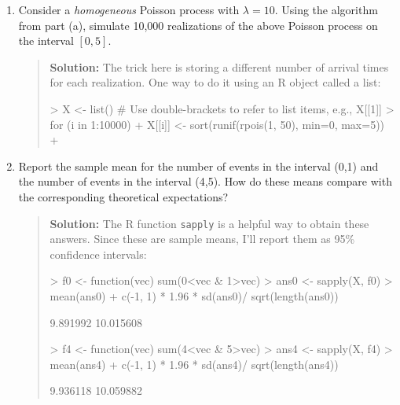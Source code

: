 \documentclass{article}
\begin{document}
\begin{enumerate}
\begin{enumerate}
  \item Consider a {\it homogeneous} Poisson process with $\lambda=10$. Using
  the algorithm from part (a), simulate 10,000 realizations of the above Poisson
  process on the interval $[0,5]$.
  \begin{quotation}{\bf Solution:}
  The trick here is storing a different number of arrival times for each realization.
  One way to do it using an R object called a list:
\begin{Schunk}
\begin{Sinput}
> X <- list()  # Use double-brackets to refer to list items, e.g., X[[1]]
> for (i in 1:10000) {
+   X[[i]] <- sort(runif(rpois(1, 50), min=0, max=5))
+ }
\end{Sinput}
\end{Schunk}
  \end{quotation}
  

  \item Report the sample mean for the number of events in the interval (0,1)
  and the number of events in the interval (4,5). How do these means compare
  with the corresponding theoretical expectations?
  \begin{quotation}{\bf Solution:}
  The R function {\tt sapply} is a helpful way to obtain these answers.  Since these are sample
  means, I'll report them as 95\% confidence intervals:
\begin{Schunk}
\begin{Sinput}
> f0 <- function(vec) sum(0<vec & 1>vec)
> ans0 <- sapply(X, f0)
> mean(ans0) + c(-1, 1) * 1.96 * sd(ans0)/ sqrt(length(ans0))
\end{Sinput}
\begin{Soutput}
[1]  9.891992 10.015608
\end{Soutput}
\begin{Sinput}
> f4 <- function(vec) sum(4<vec & 5>vec)
> ans4 <- sapply(X, f4)
> mean(ans4) + c(-1, 1) * 1.96 * sd(ans4)/ sqrt(length(ans4))
\end{Sinput}
\begin{Soutput}
[1]  9.936118 10.059882
\end{Soutput}
\end{Schunk}
  \end{quotation}
  


\end{enumerate}
\end{enumerate}
\end{document}
